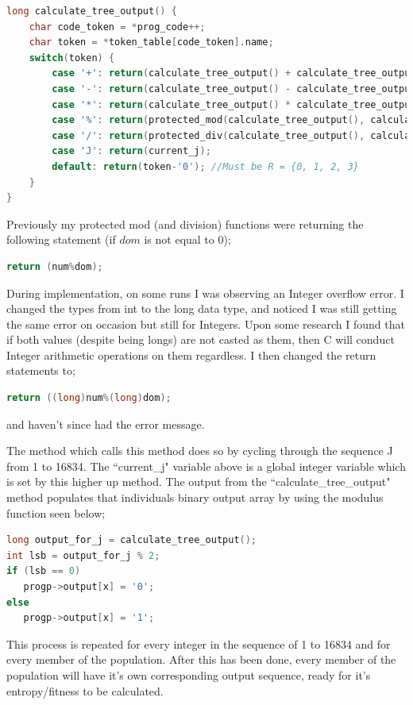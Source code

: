 \documentclass[a4paper,10.5pt]{article}
\begin{document}
\begin{lstlisting}[language=C]
long calculate_tree_output() {
	char code_token = *prog_code++;
	char token = *token_table[code_token].name; 
	switch(token) {
		case '+': return(calculate_tree_output() + calculate_tree_output());
		case '-': return(calculate_tree_output() - calculate_tree_output());
		case '*': return(calculate_tree_output() * calculate_tree_output());
		case '%': return(protected_mod(calculate_tree_output(), calculate_tree_output()));
		case '/': return(protected_div(calculate_tree_output(), calculate_tree_output()));
		case 'J': return(current_j);
		default: return(token-'0'); //Must be R = {0, 1, 2, 3} 
	}
}
\end{lstlisting}

Previously my protected mod (and division) functions were returning the following statement (if $dom$ is not equal to 0); 

\begin{lstlisting}[language=C]
return (num%dom);
\end{lstlisting}

During implementation, on some runs I was observing an Integer overflow error. I changed the types from int to the long data type, and noticed I was still getting the same error on occasion but still for Integers. Upon some research I found that if both values (despite being longs) are not casted as them, then C will conduct Integer arithmetic operations on them regardless. I then changed the return statements to;

\begin{lstlisting}[language=C]
return ((long)num%(long)dom);
\end{lstlisting}
\noindent and haven't since had the error message.

The method which calls this method does so by cycling through the sequence J from 1 to 16834. The ``current\_j" variable above is a global integer variable which is set by this higher up method. The output from the ``calculate\_tree\_output" method populates that individuals binary output array by using the modulus function seen below;

\begin{lstlisting}[language=C]
long output_for_j = calculate_tree_output();
int lsb = output_for_j % 2;
if (lsb == 0) 
   progp->output[x] = '0';
else
   progp->output[x] = '1';
\end{lstlisting}

This process is repeated for every integer in the sequence of 1 to 16834 and for every member of the population. After this has been done, every member of the population will have it's own corresponding output sequence, ready for it's entropy/fitness to be calculated. 
\end{document}
